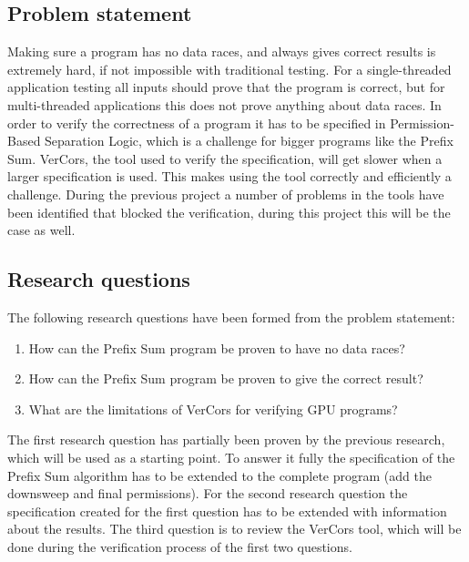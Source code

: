 \documentclass[a4paper]{article}
\begin{document}
\subsection{Problem statement}
Making sure a program has no data races, and always gives correct results is extremely hard, if not impossible with traditional testing. For a single-threaded application testing all inputs should prove that the program is correct, but for multi-threaded applications this does not prove anything about data races. In order to verify the correctness of a program it has to be specified in Permission-Based Separation Logic, which is a challenge for bigger programs like the Prefix Sum. VerCors, the tool used to verify the specification, will get slower when a larger specification is used. This makes using the tool correctly and efficiently a challenge. During the previous project a number of problems in the tools have been identified that blocked the verification, during this project this will be the case as well.

\subsection{Research questions}
The following research questions have been formed from the problem statement:
\begin{enumerate}
	\item How can the Prefix Sum program be proven to have no data races?
	\item How can the Prefix Sum program be proven to give the correct result?
	\item What are the limitations of VerCors for verifying GPU programs?
\end{enumerate}

The first research question has partially been proven by the previous research, which will be used as a starting point. To answer it fully the specification of the Prefix Sum algorithm has to be extended to the complete program (add the downsweep and final permissions). For the second research question the specification created for the first question has to be extended with information about the results. The third question is to review the VerCors tool, which will be done during the verification process of the first two questions.
\end{document}
